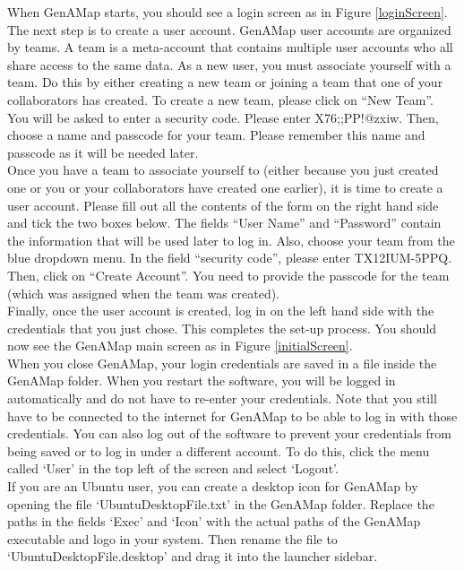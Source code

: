 \documentclass{article}
\begin{document}
When GenAMap starts, you should see a login screen as in Figure \ref{loginScreen}. The next step is to create a user account. GenAMap user accounts are organized by teams. A team is a meta-account that contains multiple user accounts who all share access to the same data. As a new user, you must associate yourself with a team. Do this by either creating a new team or joining a team that one of your collaborators has created. To create a new team, please click on ``New Team''. You will be asked to enter a security code. Please enter X76;;PP!@zxiw. Then, choose a name and passcode for your team. Please remember this name and passcode as it will be needed later.\\

Once you have a team to associate yourself to (either because you just created one or you or your collaborators have created one earlier), it is time to create a user account. Please fill out all the contents of the form on the right hand side and tick the two boxes below. The fields ``User Name'' and ``Password'' contain the information that will be used later to log in. Also, choose your team from the blue dropdown menu. In the field ``security code'', please enter TX12IUM-5PPQ. Then, click on ``Create Account''. You need to provide the passcode for the team (which was assigned when the team was created).\\

Finally, once the user account is created, log in on the left hand side with the credentials that you just chose. This completes the set-up process. You should now see the GenAMap main screen as in Figure \ref{initialScreen}.\\

When you close GenAMap, your login credentials are saved in a file inside the GenAMap folder. When you restart the software, you will be logged in automatically and do not have to re-enter your credentials. Note that you still have to be connected to the internet for GenAMap to be able to log in with those credentials. You can also log out of the software to prevent your credentials from being saved or to log in under a different account. To do this, click the menu called `User' in the top left of the screen and select `Logout'.\\

If you are an Ubuntu user, you can create a desktop icon for GenAMap by opening the file `UbuntuDesktopFile.txt' in the GenAMap folder. Replace the paths in the fields `Exec' and `Icon' with the actual paths of the GenAMap executable and logo in your system. Then rename the file to `UbuntuDesktopFile.desktop' and drag it into the launcher sidebar.
\end{document}
